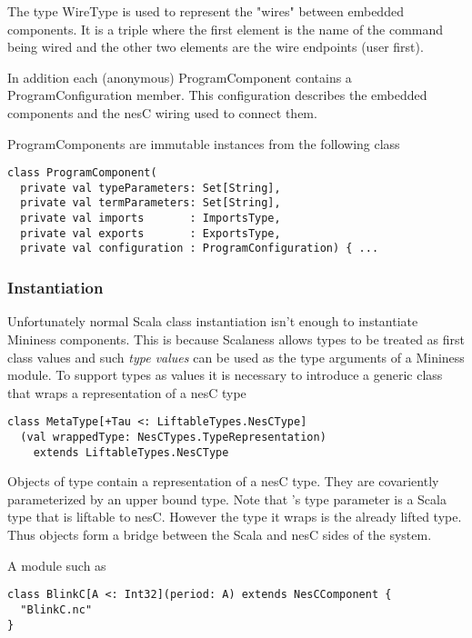 The type WireType is used to represent the "wires" between embedded components. It is a triple
where the first element is the name of the command being wired and the other two elements are
the wire endpoints (user first).

In addition each (anonymous) ProgramComponent contains a ProgramConfiguration member. This
configuration describes the embedded components and the nesC wiring used to connect them.

ProgramComponents are immutable instances from the following class

\singlespace
\begin{lstlisting}[language=scalaness]
class ProgramComponent(
  private val typeParameters: Set[String],
  private val termParameters: Set[String],
  private val imports       : ImportsType,
  private val exports       : ExportsType,
  private val configuration : ProgramConfiguration) { ...
\end{lstlisting}
\primaryspacing

\subsubsection{Instantiation}

Unfortunately normal Scala class instantiation isn't enough to instantiate Mininess components.
This is because Scalaness allows types to be treated as first class values and such \textit{type
  values} can be used as the type arguments of a Mininess module. To support types as values it
is necessary to introduce a generic class that wraps a representation of a nesC type

\singlespace
\begin{lstlisting}[language=scalaness]
class MetaType[+Tau <: LiftableTypes.NesCType]
  (val wrappedType: NesCTypes.TypeRepresentation)
    extends LiftableTypes.NesCType
\end{lstlisting}
\primaryspacing

Objects of type  contain a representation of a nesC type. They are
covariently parameterized by an upper bound type. Note that 's type
parameter is a Scala type that is liftable to nesC. However the type it wraps is the already
lifted type. Thus  objects form a bridge between the Scala and nesC sides
of the system.

A module such as

\singlespace
\begin{lstlisting}[language=scalaness]
class BlinkC[A <: Int32](period: A) extends NesCComponent {
  "BlinkC.nc"
}
\end{lstlisting}
\primaryspacing

